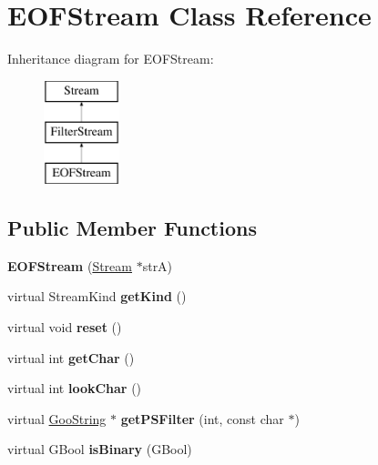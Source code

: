 \hypertarget{class_e_o_f_stream}{}\section{E\+O\+F\+Stream Class Reference}
\label{class_e_o_f_stream}
Inheritance diagram for E\+O\+F\+Stream\+:\begin{figure}[H]
\begin{center}
\leavevmode
\includegraphics[height=3.000000cm]{class_e_o_f_stream}
\end{center}
\end{figure}
\subsection*{Public Member Functions}
\begin{DoxyCompactItemize}
\item 
\mbox{\label{class_e_o_f_stream_a5332efd25af4d1a739605edd18faeb49}} 
{\bfseries E\+O\+F\+Stream} (\hyperlink{class_stream}{Stream} $\ast$strA)
\item 
\mbox{\label{class_e_o_f_stream_a29408345d51776a1872e7c613053b0b7}} 
virtual Stream\+Kind {\bfseries get\+Kind} ()
\item 
\mbox{\label{class_e_o_f_stream_a3ed50107f47b416b339cd20aa5e52c3a}} 
virtual void {\bfseries reset} ()
\item 
\mbox{\label{class_e_o_f_stream_a0aa243642ca58368e25ec164f9471ef7}} 
virtual int {\bfseries get\+Char} ()
\item 
\mbox{\label{class_e_o_f_stream_a14ef011e99527b7580e3b45193da064c}} 
virtual int {\bfseries look\+Char} ()
\item 
\mbox{\label{class_e_o_f_stream_a289cf9950348d50ddb4db990ed97fd06}} 
virtual \hyperlink{class_goo_string}{Goo\+String} $\ast$ {\bfseries get\+P\+S\+Filter} (int, const char $\ast$)
\item 
\mbox{\label{class_e_o_f_stream_a9e3b0e503a4988bd1cce2ff6f7bf90a7}} 
virtual G\+Bool {\bfseries is\+Binary} (G\+Bool)
\end{DoxyCompactItemize}
